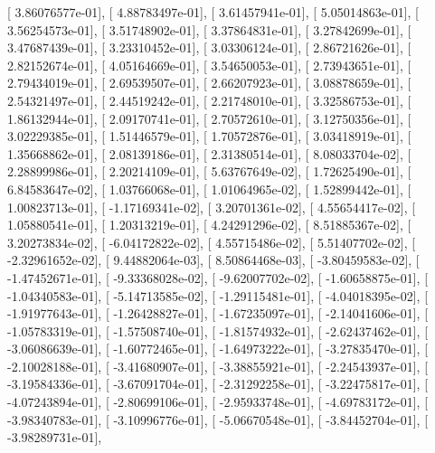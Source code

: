 \documentclass{article}
\begin{document}
       [  3.86076577e-01],
       [  4.88783497e-01],
       [  3.61457941e-01],
       [  5.05014863e-01],
       [  3.56254573e-01],
       [  3.51748902e-01],
       [  3.37864831e-01],
       [  3.27842699e-01],
       [  3.47687439e-01],
       [  3.23310452e-01],
       [  3.03306124e-01],
       [  2.86721626e-01],
       [  2.82152674e-01],
       [  4.05164669e-01],
       [  3.54650053e-01],
       [  2.73943651e-01],
       [  2.79434019e-01],
       [  2.69539507e-01],
       [  2.66207923e-01],
       [  3.08878659e-01],
       [  2.54321497e-01],
       [  2.44519242e-01],
       [  2.21748010e-01],
       [  3.32586753e-01],
       [  1.86132944e-01],
       [  2.09170741e-01],
       [  2.70572610e-01],
       [  3.12750356e-01],
       [  3.02229385e-01],
       [  1.51446579e-01],
       [  1.70572876e-01],
       [  3.03418919e-01],
       [  1.35668862e-01],
       [  2.08139186e-01],
       [  2.31380514e-01],
       [  8.08033704e-02],
       [  2.28899986e-01],
       [  2.20214109e-01],
       [  5.63767649e-02],
       [  1.72625490e-01],
       [  6.84583647e-02],
       [  1.03766068e-01],
       [  1.01064965e-02],
       [  1.52899442e-01],
       [  1.00823713e-01],
       [ -1.17169341e-02],
       [  3.20701361e-02],
       [  4.55654417e-02],
       [  1.05880541e-01],
       [  1.20313219e-01],
       [  4.24291296e-02],
       [  8.51885367e-02],
       [  3.20273834e-02],
       [ -6.04172822e-02],
       [  4.55715486e-02],
       [  5.51407702e-02],
       [ -2.32961652e-02],
       [  9.44882064e-03],
       [  8.50864468e-03],
       [ -3.80459583e-02],
       [ -1.47452671e-01],
       [ -9.33368028e-02],
       [ -9.62007702e-02],
       [ -1.60658875e-01],
       [ -1.04340583e-01],
       [ -5.14713585e-02],
       [ -1.29115481e-01],
       [ -4.04018395e-02],
       [ -1.91977643e-01],
       [ -1.26428827e-01],
       [ -1.67235097e-01],
       [ -2.14041606e-01],
       [ -1.05783319e-01],
       [ -1.57508740e-01],
       [ -1.81574932e-01],
       [ -2.62437462e-01],
       [ -3.06086639e-01],
       [ -1.60772465e-01],
       [ -1.64973222e-01],
       [ -3.27835470e-01],
       [ -2.10028188e-01],
       [ -3.41680907e-01],
       [ -3.38855921e-01],
       [ -2.24543937e-01],
       [ -3.19584336e-01],
       [ -3.67091704e-01],
       [ -2.31292258e-01],
       [ -3.22475817e-01],
       [ -4.07243894e-01],
       [ -2.80699106e-01],
       [ -2.95933748e-01],
       [ -4.69783172e-01],
       [ -3.98340783e-01],
       [ -3.10996776e-01],
       [ -5.06670548e-01],
       [ -3.84452704e-01],
       [ -3.98289731e-01],
\end{document}
